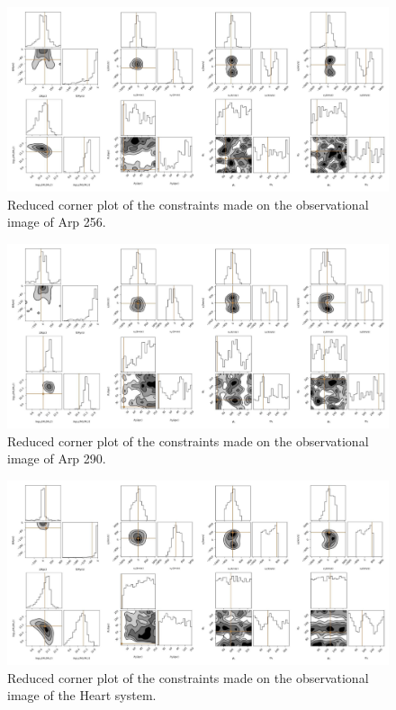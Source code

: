 \begin{figure}
    \centering
    \includegraphics[width=\textwidth]{Chapter1/figures/Arp256-obs-red-corner.pdf}
    \caption[Reduced corner plot of the constraints made on the observational image of Arp 256.]{Reduced corner plot of the constraints made on the observational image of Arp 256.}
    \label{fig:Arp290-obs}
\end{figure}

\begin{figure}
    \centering
    \includegraphics[width=\textwidth]{Chapter1/figures/Arp290-obs-red-corner.pdf}
    \caption[Reduced corner plot of the constraints made on the observational image of Arp 290.]{Reduced corner plot of the constraints made on the observational image of Arp 290. }
    \label{fig:Arp256-obs}
\end{figure}

\begin{figure}
    \centering
    \includegraphics[width=\textwidth]{Chapter1/figures/Heart-obs-red-corner.pdf}
    \caption[Reduced corner plot of the constraints made on the observational image of the Heart system.]{Reduced corner plot of the constraints made on the observational image of the Heart system.}
    \label{fig:Heart-obs}
\end{figure}

